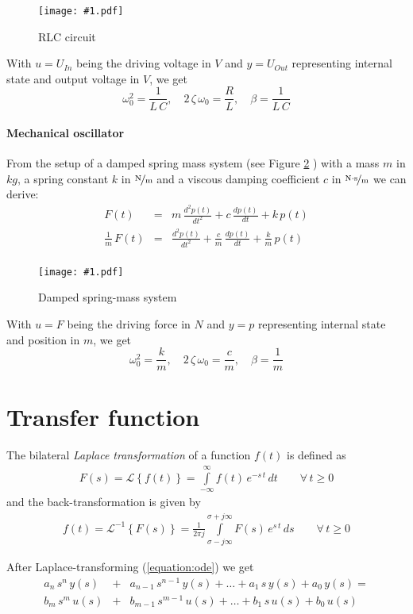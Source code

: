\documentclass[a4paper,12pt]{article}
\newcommand{\Fig}[3]{%
	\begin{figure}[htb]%
	\begin{center}%
	\texttt{[image: \#1.pdf]}%
	\end{center}%
	\caption{#3\label{fig:#1}}%
	\end{figure}%
	}
\newcommand{\FigRef}[1]{%
	Figure \ref{fig:#1}%
	}
\newcommand{\pfrac}[2]{\frac{#1}{#2}}
\newcommand{\Section}[2]{\section{#2}\label{section:#1}}
\newcommand{\ELabel}[1]{\label{equation:#1}}
\newcommand{\ERef}[1]{(\ref{equation:#1})}
\begin{document}
\Fig{elecoscil}{0.5}{RLC circuit}

With $u=U_{In}$ being the driving voltage in $\unit{V}$ and $y=U_{Out}$
representing internal state and output voltage in $\unit{V}$, we get
\begin{equation}
\omega_0^2=\pfrac{1}{L\,C},\quad2\,\zeta\,\omega_0=\pfrac{R}{L},\quad\beta=\pfrac{1}{L\,C}
\end{equation}

\paragraph{Mechanical oscillator}

From the setup of a damped spring mass system (see \FigRef{mechoscil}) with a
mass $m$ in $\unit{kg}$, a spring constant $k$ in $\unitfrac{N}{m}$ and a
viscous damping coefficient $c$ in $\unitfrac{N\cdot s}{m}$ we can derive:
\begin{eqnarray}
F(t)&=&m\,\frac{d^2p(t)}{dt^2}+c\,\frac{dp(t)}{dt}+k\,p(t)\\
\frac{1}{m}\,F(t)&=&\frac{d^2p(t)}{dt^2}+\frac{c}{m}\,\frac{dp(t)}{dt}+\frac{k}{m}\,p(t)\\
\end{eqnarray}

\Fig{mechoscil}{0.5}{Damped spring-mass system}

With $u=F$ being the driving force in $\unit{N}$ and $y=p$ representing
internal state and position in $\unit{m}$, we get
\begin{equation}
\omega_0^2=\pfrac{k}{m},\quad2\,\zeta\,\omega_0=\pfrac{c}{m},\quad\beta=\pfrac{1}{m}
\end{equation}


\Section{xferfunc}{Transfer function}

The bilateral {\em Laplace transformation} of a function $f(t)$ is defined as
\begin{eqnarray}
F(s)=\mathcal{L}\left\{f(t)\right\}=\int\limits_{-\infty}^{\infty}f(t)\,e^{-s\,t}\,dt\qquad\forall\,t\geq0
\end{eqnarray}
and the back-transformation is given by
\begin{eqnarray}
f(t)=\mathcal{L}^{-1}\left\{F(s)\right\}=\frac{1}{2\pi j}\int\limits_{\sigma-j\infty}^{\sigma+j\infty}F(s)\,e^{s\,t}\,ds\qquad\forall\,t\geq0
\end{eqnarray}

After Laplace-transforming \ERef{ode} we get
\begin{eqnarray}
\ELabel{xfer}
a_{n}\,s^{n}\,y(s)&+&a_{n-1}\,s^{n-1}\,y(s)+\ldots+a_{1}\,s\,y(s)+a_{0}\,y(s)=\nonumber\\
b_{m}\,s^{m}\,u(s)&+&b_{m-1}\,s^{m-1}\,u(s)+\ldots+b_{1}\,s\,u(s)+b_{0}\,u(s)
\end{eqnarray}
\end{document}
